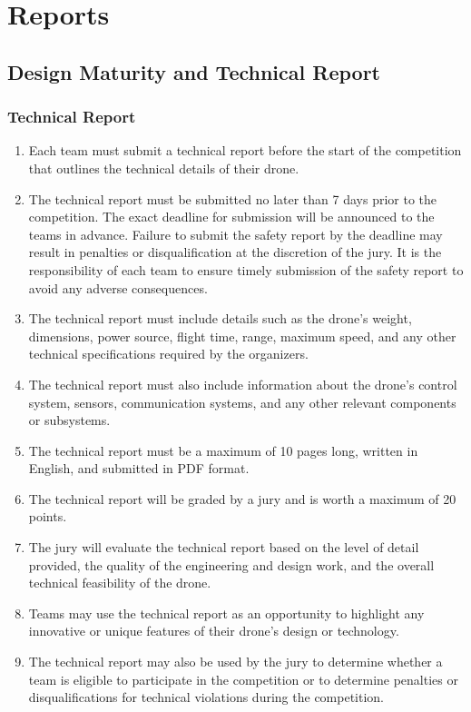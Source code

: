     \section{Reports}

    \subsection{Design Maturity and Technical Report}
    \subsubsection{Technical Report}
    \begin{enumerate}
    \item Each team must submit a technical report before the start of the competition that outlines the technical details of their drone.
    \item The technical report must be submitted no later than 7 days prior to the competition. The exact deadline for submission will be announced to the teams in advance. Failure to submit the safety report by the deadline may result in penalties or disqualification at the discretion of the jury. It is the responsibility of each team to ensure timely submission of the safety report to avoid any adverse consequences.
    \item The technical report must include details such as the drone's weight, dimensions, power source, flight time, range, maximum speed, and any other technical specifications required by the organizers.
    \item The technical report must also include information about the drone's control system, sensors, communication systems, and any other relevant components or subsystems.
    \item The technical report must be a maximum of 10 pages long, written in English, and submitted in PDF format.
    \item The technical report will be graded by a jury and is worth a maximum of 20 points.
    \item The jury will evaluate the technical report based on the level of detail provided, the quality of the engineering and design work, and the overall technical feasibility of the drone.
    \item Teams may use the technical report as an opportunity to highlight any innovative or unique features of their drone's design or technology.
    \item The technical report may also be used by the jury to determine whether a team is eligible to participate in the competition or to determine penalties or disqualifications for technical violations during the competition.
    \end{enumerate}
    
